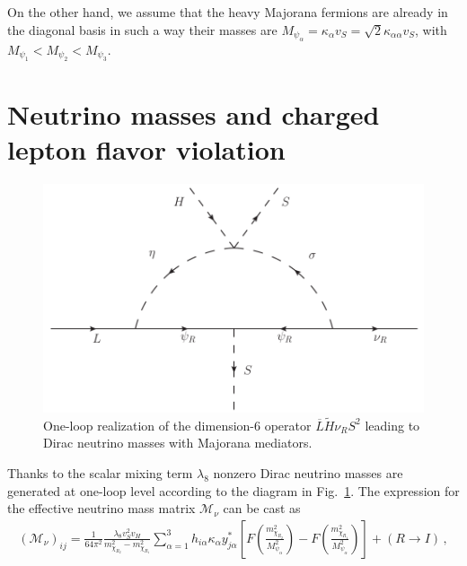 \documentclass[12pt]{article}
\begin{document}
On the other hand, we assume that the heavy Majorana fermions are already in the diagonal basis in such a way their masses are $M_{\psi_\alpha}=\kappa_{\alpha}v_S=\sqrt{2}\kappa_{\alpha\alpha}v_S$, with $M_{\psi_1}<M_{\psi_2}<M_{\psi_3}$.

\section{Neutrino masses and charged lepton flavor violation}
\label{sec:Neutrinos}
%
\begin{figure}
\centering
\includegraphics[scale=0.6]{Neutrino_Loop.pdf}
\caption{One-loop realization of the dimension-6 operator $\overline{L} \tilde{H} \nu_R S^2$ leading to Dirac neutrino masses with Majorana mediators.}
\label{fig:zee}
\end{figure}
%
Thanks to the scalar mixing term $\lambda_8$ nonzero Dirac neutrino masses are generated at one-loop level according to the diagram in  Fig.~\ref{fig:zee}. The expression for the effective neutrino mass matrix $\mathcal{M}_{\nu}$ can be cast as
%
\begin{align}
(\mathcal{M}_{\nu})_{ij} = \frac{1}{64 \pi^{2}}  \frac{\lambda_8 v_S^2 v_H} {m_{\chi_{R_2}}^{2}-m_{\chi_{R_1}}^{2}}\sum_{\alpha=1}^{3} h_{i \alpha} \kappa_\alpha y^{*}_{j\alpha}\left[ F\left( \frac{m_{\chi_{R_2}}^{2}}{M_{\psi_{\alpha}}^{2}} \right) - F\left( \frac{m_{\chi_{R_1}}^{2}}{M_{\psi_{\alpha}}^{2}} \right) \right] + (R \to I)\,,
\end{align}
\end{document}
